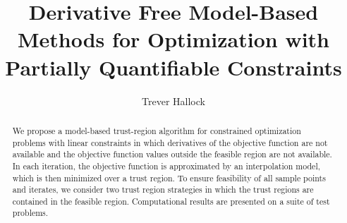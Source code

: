 \documentclass{article}
\title{Derivative Free Model-Based Methods for Optimization with Partially Quantifiable Constraints}
\author{Trever Hallock}
\begin{document}
\maketitle

\begin{abstract}

We propose a model-based trust-region algorithm for constrained optimization problems with linear constraints in which derivatives of the objective function are not available and the objective function values outside the feasible region are not available.
In each iteration, the objective function is approximated by an interpolation model, which is then minimized over a trust region.
To ensure feasibility of all sample points and iterates, we consider two trust region strategies in which the trust regions are contained in the feasible region.
Computational results are presented on a suite of test problems.

\end{abstract}

\newpage

\tableofcontents

\newpage






















\appendix





\end{document}
